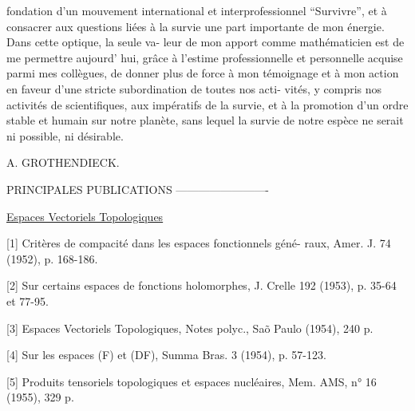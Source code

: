 
fondation d'un mouvement international et interprofessionnel
``Survivre'', et à consacrer aux questions liées à la survie une
\placedmargin{\hand{(}}part importante de mon énergie. Dans cette optique, la seule va-%
leur de mon apport comme mathématicien est de me permettre aujourd'%
hui, grâce à l'estime professionnelle et personnelle acquise parmi
mes collègues, de donner plus de force à mon témoignage et à mon
action en faveur d'une stricte subordination de toutes nos acti-%
vités, y compris nos activités de scientifiques, aux impératifs
\placedmargin{\hand{(}}\placedmargin{\hand{$\vert$}}de la survie, et à la promotion d'un ordre stable et humain sur
notre planète, sans lequel la survie de notre espèce ne serait
ni possible, ni désirable.

A. GROTHENDIECK.

PRINCIPALES PUBLICATIONS
-------------------------

\uline{Espaces Vectoriels Topologiques}

[1] Critères de compacité dans les espaces fonctionnels géné-%
raux, Amer. J. 74 (1952), p. 168-186.

[2] Sur certains espaces de fonctions holomorphes, J. Crelle
192 (1953), p. 35-64 et 77-95.

[3] Espaces Vectoriels Topologiques, Notes polyc., Sa\~o Paulo
(1954), 240 p.

[4] Sur les espaces (F) et (DF), Summa Bras. 3 (1954),
p. 57-123.

[5] Produits tensoriels topologiques et espaces nucléaires,
Mem. AMS, n° 16 (1955), 329 p.

